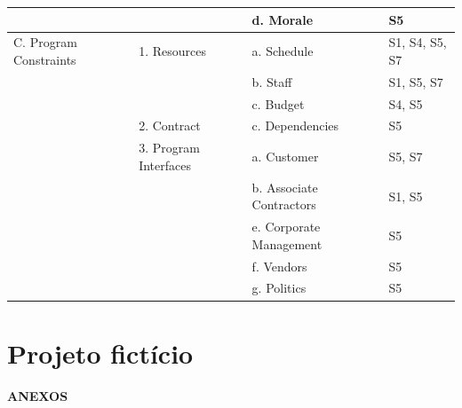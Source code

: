 \documentclass[
	12pt,
	openright,
	twoside,
	a4paper,
	english,
	brazil
	]{abntex2}
\begin{document}
\begin{apendices}
\begin{longtable}{|>{\raggedright\arraybackslash}p{2.4cm}|p{4.5cm}|p{4.7cm}|l|}
  \cline{3-4}
  & & d. Morale & S5 \\
  \hline
  C. Program Constraints & 1. Resources & a. Schedule & S1, S4, S5, S7 \\
  \cline{3-4}
  & & b. Staff & S1, S5, S7 \\
  \cline{3-4}
  & & c. Budget & S4, S5 \\
  \cline{2-4}
  & 2. Contract & c. Dependencies & S5 \\
  \cline{2-4}
  & 3. Program Interfaces & a. Customer & S5, S7 \\
  \cline{3-4}
  & & b. Associate Contractors & S1, S5 \\
  \cline{3-4}
  & & e. Corporate Management & S5 \\
  \cline{3-4}
  & & f. Vendors & S5 \\
  \cline{3-4}
  & & g. Politics & S5 \\
  \hline
\end{longtable}

\chapter{Projeto fictício}
\label{apendiceD}



\end{apendices} %


{}
\thispagestyle{empty}
\vspace*{\fill}
\begin{center}
    \textbf{\Huge ANEXOS}
\end{center}
\vspace*{\fill}
\cleardoublepage
\end{document}
